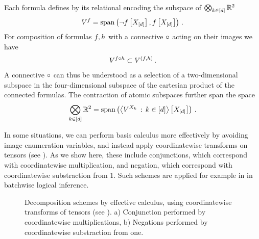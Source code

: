 \begin{example}
    Each formula defines by its relational encoding the subspace of $\bigotimes_{k\in[d]}\mathbb{R}^2$
    \begin{align*}
        V^{f} = \mathrm{span}\left(\lnot f\left[X_{[d]}\right],f\left[X_{[d]}\right]\right) \, .
    \end{align*}
    For composition of formulas $f,h$ with a connective $\circ$ acting on their images we have %
    \begin{align*}
        V^{f\circ h}
        \subset V^{(f,h)} \, .
    \end{align*}
    A connective $\circ$ can thus be understood as a selection of a two-dimensional subspace in the four-dimensional subspace of the cartesian product of the connected formulas.
    The contraction of atomic subspaces further span the space
    \begin{align*}
	    \bigotimes_{k\in[d]}\mathbb{R}^2 = \mathrm{span}\left(\left\langle 
		    V^{X_{k}} \, : \, k\in[d]
	    \right\rangle \left[ X_{[d]} \right]\right) \, .
    \end{align*}
\end{example}




\label{sec:effectiveCalculus}

In some situations, we can perform basis calculus more effectively by avoiding image enumeration variables, and instead apply coordinatewise transforms on tensors (see ).
As we show here, these include conjunctions, which correspond with coordinatewise multiplication, and negation, which correspond with coordinatewise substraction from 1.
Such schemes are applied for example in \cite{tsilionis_tensor-based_2024} in batchwise logical inference.

\begin{figure}
\begin{center}
	
\end{center}
\caption{Decomposition schemes by effective calculus, using coordinatewise transforms of tensors (see ).
	a) Conjunction performed by coordinatewise multiplications, b) Negations performed by coordinatewise substraction from one.}\label{fig:ConNegDecomposition}
\end{figure}

